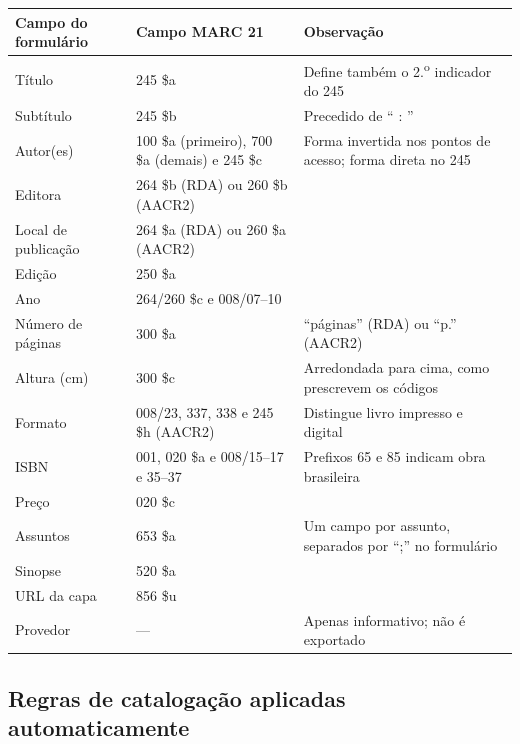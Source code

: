 \begin{quadro}[htbp]
    \centering
    \caption{Correspondência entre os campos do formulário e os campos MARC 21}
    \label{qua:formulario-marc}
    \footnotesize
    \begin{tabular}{|p{}|p{}|p{}|}
        \hline
        \textbf{Campo do formulário} & \textbf{Campo MARC 21} & \textbf{Observação} \\ \hline
        Título & 245 \$a & Define também o 2.\textsuperscript{o} indicador do 245 \\ \hline
        Subtítulo & 245 \$b & Precedido de `` : '' \\ \hline
        Autor(es) & 100 \$a (primeiro), 700 \$a (demais) e 245 \$c & Forma invertida nos pontos de acesso; forma direta no 245 \\ \hline
        Editora & 264 \$b (RDA) ou 260 \$b (AACR2) & \\ \hline
        Local de publicação & 264 \$a (RDA) ou 260 \$a (AACR2) & \\ \hline
        Edição & 250 \$a & \\ \hline
        Ano & 264/260 \$c e 008/07--10 & \\ \hline
        Número de páginas & 300 \$a & ``páginas'' (RDA) ou ``p.'' (AACR2) \\ \hline
        Altura (cm) & 300 \$c & Arredondada para cima, como prescrevem os códigos \\ \hline
        Formato & 008/23, 337, 338 e 245 \$h (AACR2) & Distingue livro impresso e digital \\ \hline
        ISBN & 001, 020 \$a e 008/15--17 e 35--37 & Prefixos 65 e 85 indicam obra brasileira \\ \hline
        Preço & 020 \$c & \\ \hline
        Assuntos & 653 \$a & Um campo por assunto, separados por ``;'' no formulário \\ \hline
        Sinopse & 520 \$a & \\ \hline
        URL da capa & 856 \$u & \\ \hline
        Provedor & --- & Apenas informativo; não é exportado \\ \hline
    \end{tabular}
\end{quadro}

\subsection{Regras de catalogação aplicadas automaticamente}
\label{subsec:func-regras}

